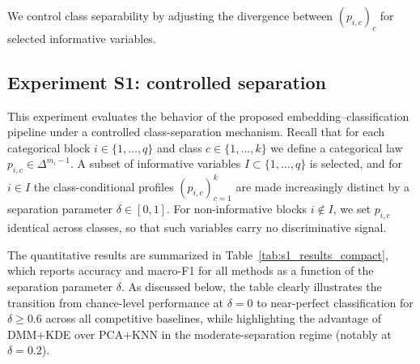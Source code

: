 \documentclass[preprint,11pt]{elsarticle}
\begin{document}
We control class separability by adjusting the divergence between $(p_{i,c})_c$ for selected informative variables.

\subsection{Experiment S1: controlled separation}
\label{subsec:synthetic_s1}

This experiment evaluates the behavior of the proposed embedding--classification pipeline under a controlled class-separation
mechanism. Recall that for each categorical block $i\in\{1,\dots,q\}$ and class $c\in\{1,\dots,k\}$ we define a categorical law
$p_{i,c}\in\Delta^{m_i-1}$. A subset of informative variables $I\subset\{1,\dots,q\}$ is selected, and for $i\in I$ the class-conditional
profiles $(p_{i,c})_{c=1}^k$ are made increasingly distinct by a separation parameter $\delta\in[0,1]$.
For non-informative blocks $i\notin I$, we set $p_{i,c}$ identical across classes, so that such variables carry no discriminative signal.

The quantitative results are summarized in Table~\ref{tab:s1_results_compact}, which reports accuracy and macro-F1 for all methods
as a function of the separation parameter $\delta$. As discussed below, the table clearly illustrates the transition from chance-level
performance at $\delta=0$ to near-perfect classification for $\delta\ge 0.6$ across all competitive baselines, while highlighting the
advantage of DMM+KDE over PCA+KNN in the moderate-separation regime (notably at $\delta=0.2$).
\end{document}
